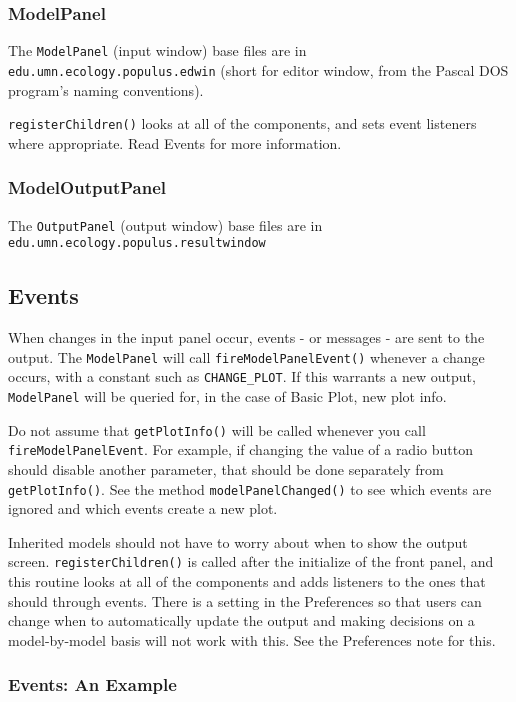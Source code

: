 \documentclass[12pt]{article}
\begin{document}
\subsubsection{ModelPanel}
The \texttt{ModelPanel}  (input window) base files are in \texttt{edu.umn.ecology.populus.edwin}  (short for editor window, from the Pascal DOS program's naming conventions).

\texttt{registerChildren()} looks at all of the components, and sets event listeners where appropriate.  Read Events for more information.

\subsubsection{ModelOutputPanel}
The \texttt{OutputPanel}  (output window) base files are in \texttt{edu.umn.ecology.populus.resultwindow}

\subsection{Events}

When changes in the input panel occur, events - or messages - are sent to the output.
The \texttt{ModelPanel}  will call \texttt{fireModelPanelEvent()}  whenever a change occurs, with a constant such as \texttt{CHANGE\_PLOT}.  If this warrants a new output, \texttt{ModelPanel}  will be queried for, in the case of Basic Plot, new plot info.

Do not assume that \texttt{getPlotInfo()} will be called whenever you call \texttt{fireModelPanelEvent}.  For example, if changing the value of a radio button should disable another parameter, that should be done separately from \texttt{getPlotInfo()}.  See the method \texttt{modelPanelChanged()} to see which events are ignored and which events create a new plot.

Inherited models should not have to worry about when to show the output screen.  \texttt{registerChildren()} is called after the initialize of the front panel, and this routine looks at all of the components and adds listeners to the ones that should through events.  There is a setting in the Preferences so that users can change when to automatically update the output and making decisions on a model-by-model basis will not work with this.  See the Preferences note for this.

\subsubsection{Events: An Example}
\end{document}
